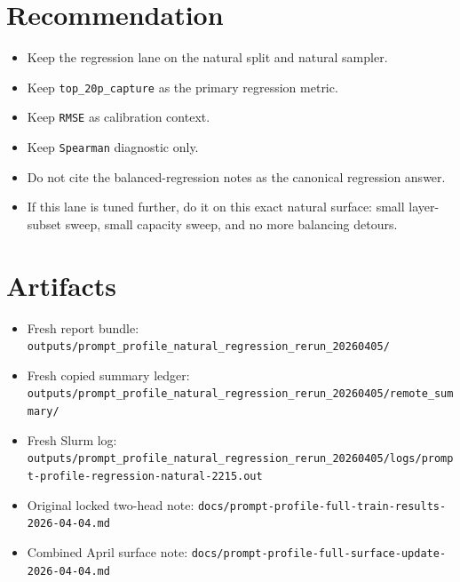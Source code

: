 \documentclass[11pt]{article}
\begin{document}
\section{Recommendation}

\begin{itemize}
\item Keep the regression lane on the natural split and natural sampler.
\item Keep \texttt{top\_20p\_capture} as the primary regression metric.
\item Keep \texttt{RMSE} as calibration context.
\item Keep \texttt{Spearman} diagnostic only.
\item Do not cite the balanced-regression notes as the canonical regression answer.
\item If this lane is tuned further, do it on this exact natural surface:
  small layer-subset sweep, small capacity sweep, and no more balancing detours.
\end{itemize}

\section{Artifacts}

\begin{itemize}
\item Fresh report bundle:
  \texttt{outputs/prompt\_profile\_natural\_regression\_rerun\_20260405/}
\item Fresh copied summary ledger:
  \texttt{outputs/prompt\_profile\_natural\_regression\_rerun\_20260405/remote\_summary/}
\item Fresh Slurm log:
  \texttt{outputs/prompt\_profile\_natural\_regression\_rerun\_20260405/logs/prompt-profile-regression-natural-2215.out}
\item Original locked two-head note:
  \texttt{docs/prompt-profile-full-train-results-2026-04-04.md}
\item Combined April surface note:
  \texttt{docs/prompt-profile-full-surface-update-2026-04-04.md}
\end{itemize}
\end{document}
